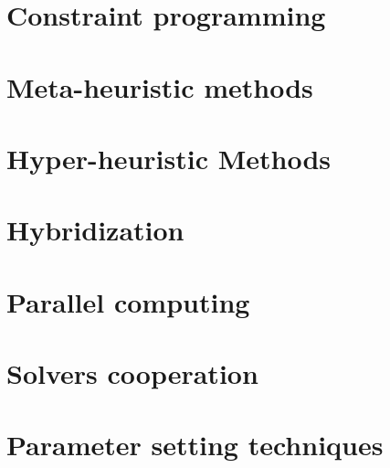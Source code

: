 
\section{Constraint programming}\label{sec:cp}


\section{Meta-heuristic methods}\label{sec:meta}


\section{Hyper-heuristic Methods}\label{sec:hyper}


\section{Hybridization}\label{sec:hybrid}


\section{Parallel computing}\label{sec:parallel}


\section{Solvers cooperation}\label{sec:cooperation}


\section{Parameter setting techniques}\label{sec:tunning}



